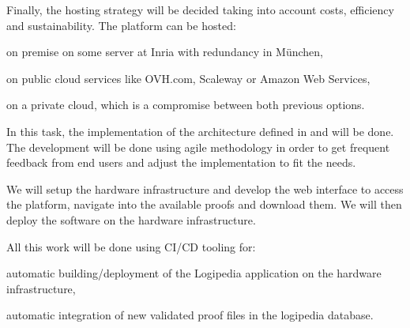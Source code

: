 \begin{workpackage}[id=access,type=RTD,wphases=1-48,
  short=Access,%
  title={Access},
  lead=Inr,InrRM=48,OcaRM=6,EduRM=12]
\begin{tasklist}
{\begin{task}[id=infra,
      title=Defining the hardware architecture for the infrastructure,
      shorttitle=HW arch.,
      lead=Inr,InrRM=1,wphases=6-7]
    Finally, the hosting strategy will be decided taking into account
    costs, efficiency and sustainability.  The platform can be hosted:
    \begin{compactitem}
    \item on premise on some server at Inria with redundancy in München,
    \item on public cloud services like OVH.com, Scaleway or Amazon
      Web Services,
    \item on a private cloud, which is a compromise between both
      previous options.
    \end{compactitem}
  \end{task}

  \begin{task}[id=web,
      title=Giving access to the infrastructure on the world-wide web,
      shorttitle=Web access,
      lead=Inr,InrRM=18,,wphases=8-27]
    In this task, the implementation of the architecture defined in
     and  will
    be done. The development will be done using agile methodology in
    order to get frequent feedback from end users and adjust the
    implementation to fit the needs.

    We will setup the hardware infrastructure and develop the web
    interface to access the platform, navigate into the available
    proofs and download them.  We will then deploy the software on the
    hardware infrastructure.

    All this work will be done using CI/CD tooling for:
    \begin{compactitem}
    \item automatic building/deployment of the Logipedia application
      on the hardware infrastructure,
    \item automatic integration of new validated proof files in the
      logipedia database.
    \end{compactitem}


\end{task}}
\end{tasklist}
\end{workpackage}
